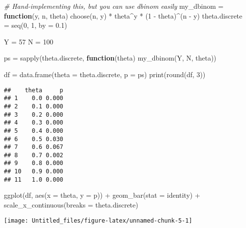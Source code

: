 \documentclass[
]{article}
\newenvironment{Shaded}{\begin{snugshade}}{\end{snugshade}}
\newcommand{\AttributeTok}[1]{\textcolor[rgb]{0.77,0.63,0.00}{#1}}
\newcommand{\CommentTok}[1]{\textcolor[rgb]{0.56,0.35,0.01}{\textit{#1}}}
\newcommand{\ControlFlowTok}[1]{\textcolor[rgb]{0.13,0.29,0.53}{\textbf{#1}}}
\newcommand{\DecValTok}[1]{\textcolor[rgb]{0.00,0.00,0.81}{#1}}
\newcommand{\FloatTok}[1]{\textcolor[rgb]{0.00,0.00,0.81}{#1}}
\newcommand{\FunctionTok}[1]{\textcolor[rgb]{0.00,0.00,0.00}{#1}}
\newcommand{\NormalTok}[1]{#1}
\newcommand{\OtherTok}[1]{\textcolor[rgb]{0.56,0.35,0.01}{#1}}
\newcommand{\SpecialCharTok}[1]{\textcolor[rgb]{0.00,0.00,0.00}{#1}}
\newcommand{\StringTok}[1]{\textcolor[rgb]{0.31,0.60,0.02}{#1}}
\begin{document}
\begin{Shaded}
\begin{Highlighting}[]
\CommentTok{\# Hand{-}implementing this, but you can use dbinom easily}
\NormalTok{my\_dbinom }\OtherTok{=} \ControlFlowTok{function}\NormalTok{(y, n, theta) }\FunctionTok{choose}\NormalTok{(n, y) }\SpecialCharTok{*}\NormalTok{ theta}\SpecialCharTok{\^{}}\NormalTok{y }\SpecialCharTok{*}\NormalTok{ (}\DecValTok{1} \SpecialCharTok{{-}}\NormalTok{ theta)}\SpecialCharTok{\^{}}\NormalTok{(n }\SpecialCharTok{{-}}\NormalTok{ y)}
\NormalTok{theta.discrete }\OtherTok{=} \FunctionTok{seq}\NormalTok{(}\DecValTok{0}\NormalTok{, }\DecValTok{1}\NormalTok{, }\AttributeTok{by =} \FloatTok{0.1}\NormalTok{)}

\NormalTok{Y }\OtherTok{=} \DecValTok{57}
\NormalTok{N }\OtherTok{=} \DecValTok{100}

\NormalTok{ps }\OtherTok{=} \FunctionTok{sapply}\NormalTok{(theta.discrete, }\ControlFlowTok{function}\NormalTok{(theta) }\FunctionTok{my\_dbinom}\NormalTok{(Y, N, theta))}

\NormalTok{df }\OtherTok{=} \FunctionTok{data.frame}\NormalTok{(}\AttributeTok{theta =}\NormalTok{ theta.discrete, }\AttributeTok{p =}\NormalTok{ ps)}
\FunctionTok{print}\NormalTok{(}\FunctionTok{round}\NormalTok{(df, }\DecValTok{3}\NormalTok{))}
\end{Highlighting}
\end{Shaded}

\begin{verbatim}
##    theta     p
## 1    0.0 0.000
## 2    0.1 0.000
## 3    0.2 0.000
## 4    0.3 0.000
## 5    0.4 0.000
## 6    0.5 0.030
## 7    0.6 0.067
## 8    0.7 0.002
## 9    0.8 0.000
## 10   0.9 0.000
## 11   1.0 0.000
\end{verbatim}

\begin{Shaded}
\begin{Highlighting}[]
\FunctionTok{ggplot}\NormalTok{(df, }\FunctionTok{aes}\NormalTok{(}\AttributeTok{x =}\NormalTok{ theta, }\AttributeTok{y =}\NormalTok{ p)) }\SpecialCharTok{+}
  \FunctionTok{geom\_bar}\NormalTok{(}\AttributeTok{stat =} \StringTok{\textquotesingle{}identity\textquotesingle{}}\NormalTok{) }\SpecialCharTok{+}
  \FunctionTok{scale\_x\_continuous}\NormalTok{(}\AttributeTok{breaks =}\NormalTok{ theta.discrete)}
\end{Highlighting}
\end{Shaded}

\begin{center}\texttt{[image: Untitled\_files/figure-latex/unnamed-chunk-5-1]} \end{center}
\end{document}
